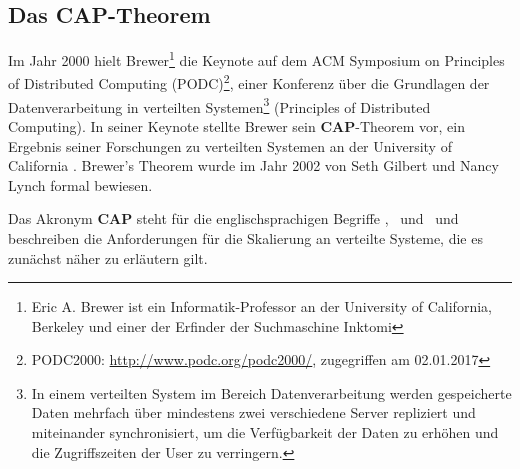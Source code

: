 \subsection{Das CAP-Theorem}

Im Jahr 2000 hielt Brewer\footnote{Eric A. Brewer ist ein Informatik-Professor an der University of California, Berkeley und einer der Erfinder der Suchmaschine Inktomi} die Keynote auf dem ACM Symposium on Principles of Distributed Computing (PODC)\footnote{PODC2000: \url{http://www.podc.org/podc2000/}, zugegriffen am 02.01.2017}, einer Konferenz über die Grundlagen der Datenverarbeitung in verteilten Systemen\footnote{In einem verteilten System im Bereich Datenverarbeitung werden gespeicherte Daten mehrfach über mindestens zwei verschiedene Server repliziert und miteinander synchronisiert, um die Verfügbarkeit der Daten zu erhöhen und die Zugriffszeiten der User zu verringern.} (Principles of Distributed Computing).  In seiner Keynote stellte Brewer sein \textbf{CAP}-Theorem vor, ein Ergebnis seiner Forschungen zu verteilten Systemen an der University of California \cite[S. 13]{Kurowski.2012}. Brewer's Theorem wurde im Jahr 2002 von Seth Gilbert und Nancy Lynch formal bewiesen.

Das Akronym \textbf{CAP} steht für die englischsprachigen Begriffe  \Cap, \cAp\ und \caP\ und beschreiben die Anforderungen für die Skalierung an verteilte Systeme, die es zunächst näher zu erläutern gilt.

